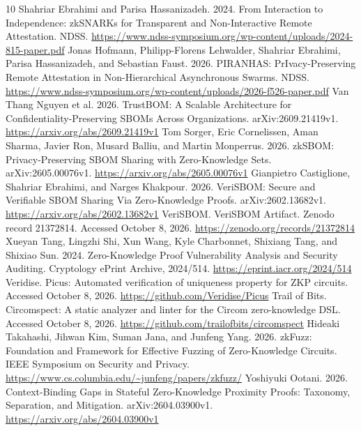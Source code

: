 \documentclass[sigconf,nonacm]{acmart}
\begin{document}
\begin{thebibliography}{10}
\sloppy
{} Shahriar Ebrahimi and Parisa Hassanizadeh. 2024. From Interaction to Independence: zkSNARKs for Transparent and Non-Interactive Remote Attestation. NDSS. \url{https://www.ndss-symposium.org/wp-content/uploads/2024-815-paper.pdf}
 Jonas Hofmann, Philipp-Florens Lehwalder, Shahriar Ebrahimi, Parisa Hassanizadeh, and Sebastian Faust. 2026. PIRANHAS: PrIvacy-Preserving Remote Attestation in Non-Hierarchical Asynchronous Swarms. NDSS. \url{https://www.ndss-symposium.org/wp-content/uploads/2026-f526-paper.pdf}
 Van Thang Nguyen et al. 2026. TrustBOM: A Scalable Architecture for Confidentiality-Preserving SBOMs Across Organizations. arXiv:2609.21419v1. \url{https://arxiv.org/abs/2609.21419v1}
 Tom Sorger, Eric Cornelissen, Aman Sharma, Javier Ron, Musard Balliu, and Martin Monperrus. 2026. zkSBOM: Privacy-Preserving SBOM Sharing with Zero-Knowledge Sets. arXiv:2605.00076v1. \url{https://arxiv.org/abs/2605.00076v1}
 Gianpietro Castiglione, Shahriar Ebrahimi, and Narges Khakpour. 2026. VeriSBOM: Secure and Verifiable SBOM Sharing Via Zero-Knowledge Proofs. arXiv:2602.13682v1. \url{https://arxiv.org/abs/2602.13682v1}
 VeriSBOM. VeriSBOM Artifact. Zenodo record 21372814. Accessed October 8, 2026. \url{https://zenodo.org/records/21372814}
 Xueyan Tang, Lingzhi Shi, Xun Wang, Kyle Charbonnet, Shixiang Tang, and Shixiao Sun. 2024. Zero-Knowledge Proof Vulnerability Analysis and Security Auditing. Cryptology ePrint Archive, 2024/514. \url{https://eprint.iacr.org/2024/514}
 Veridise. Picus: Automated verification of uniqueness property for ZKP circuits. Accessed October 8, 2026. \url{https://github.com/Veridise/Picus}
 Trail of Bits. Circomspect: A static analyzer and linter for the Circom zero-knowledge DSL. Accessed October 8, 2026. \url{https://github.com/trailofbits/circomspect}
 Hideaki Takahashi, Jihwan Kim, Suman Jana, and Junfeng Yang. 2026. zkFuzz: Foundation and Framework for Effective Fuzzing of Zero-Knowledge Circuits. IEEE Symposium on Security and Privacy. \url{https://www.cs.columbia.edu/~junfeng/papers/zkfuzz/}
 Yoshiyuki Ootani. 2026. Context-Binding Gaps in Stateful Zero-Knowledge Proximity Proofs: Taxonomy, Separation, and Mitigation. arXiv:2604.03900v1. \url{https://arxiv.org/abs/2604.03900v1}
\end{thebibliography}
\end{document}
